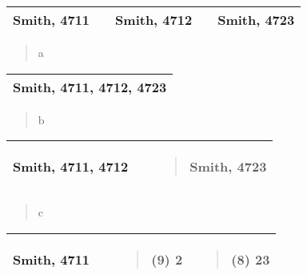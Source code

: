 \begin{longtable}[]{@{}lllll@{}}
\toprule
\endhead
Smith, 4711 & & Smith, 4712 & & Smith, 4723\tabularnewline
\bottomrule
\end{longtable}

\begin{quote}
a
\end{quote}

\begin{longtable}[]{@{}l@{}}
\toprule
\endhead
Smith, 4711, 4712, 4723\tabularnewline
\bottomrule
\end{longtable}

\begin{quote}
b
\end{quote}

\begin{longtable}[]{@{}lll@{}}
\toprule
\endhead
\begin{minipage}[t]{0.30\columnwidth}\raggedright
Smith, 4711, 4712\strut
\end{minipage} & \begin{minipage}[t]{0.30\columnwidth}\raggedright
\strut
\end{minipage} & \begin{minipage}[t]{0.30\columnwidth}\raggedright
\begin{quote}
Smith, 4723
\end{quote}\strut
\end{minipage}\tabularnewline
\bottomrule
\end{longtable}

\begin{quote}
c
\end{quote}

\begin{longtable}[]{@{}llll@{}}
\toprule
\endhead
\begin{minipage}[t]{0.22\columnwidth}\raggedright
Smith, 4711\strut
\end{minipage} & \begin{minipage}[t]{0.22\columnwidth}\raggedright
\strut
\end{minipage} & \begin{minipage}[t]{0.22\columnwidth}\raggedright
\begin{quote}
(9) 2
\end{quote}\strut
\end{minipage} & \begin{minipage}[t]{0.22\columnwidth}\raggedright
\begin{quote}
(8) 23
\end{quote}\strut
\end{minipage}\tabularnewline
\bottomrule
\end{longtable}

